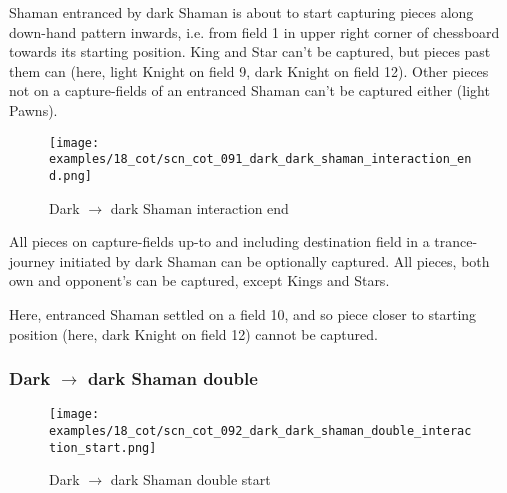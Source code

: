 \vspace*{-0.5\baselineskip}
Shaman entranced by dark Shaman is about to start capturing pieces along down-hand
pattern inwards, i.e. from field 1 in upper right corner of chessboard towards its
starting position.\newline
\indent
King and Star can't be captured, but pieces past them can (here, light Knight on
field 9, dark Knight on field 12). Other pieces not on a capture-fields of an
entranced Shaman can't be captured either (light Pawns).

\clearpage %

\noindent
\begin{figure}[!h]
\texttt{[image: examples/18\_cot/scn\_cot\_091\_dark\_dark\_shaman\_interaction\_end.png]}
\caption{Dark $\rightarrow$ dark Shaman interaction end}
\label{fig:scn_cot_091_dark_dark_shaman_interaction_end}
\end{figure}

All pieces on capture-fields up-to and including destination field in a
trance-journey initiated by dark Shaman can be optionally captured. All
pieces, both own and opponent's can be captured, except Kings and Stars.

Here, entranced Shaman settled on a field 10, and so piece closer to
starting position (here, dark Knight on field 12) cannot be captured.

\clearpage %

\subsubsection*{Dark $\rightarrow$ dark Shaman double}
\label{sec:Conquest of Tlalocan/Trance-journey/Interactions/Dark --> dark Shaman double}

\vspace*{-1.4\baselineskip}
\noindent
\begin{figure}[!h]
\texttt{[image: examples/18\_cot/scn\_cot\_092\_dark\_dark\_shaman\_double\_interaction\_start.png]}
\caption{Dark $\rightarrow$ dark Shaman double start}
\label{fig:scn_cot_092_dark_dark_shaman_double_interaction_start}
\end{figure}

